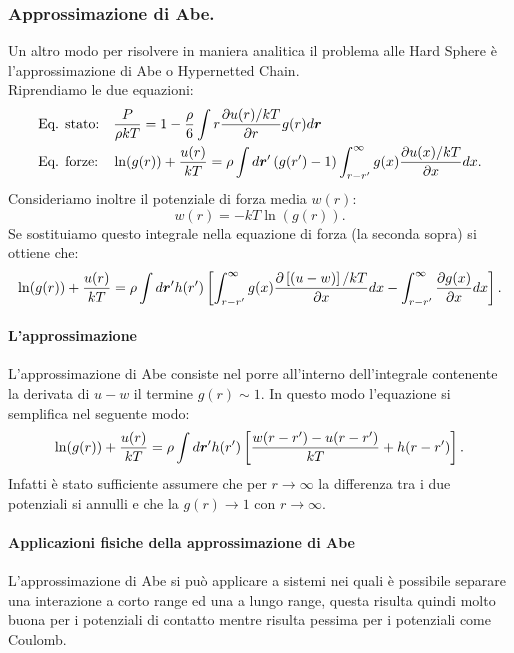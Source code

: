 \subsubsection{Approssimazione di Abe.}
\label{subsubsec:Approssimazione di Abe.}
Un altro modo per risolvere in maniera analitica il problema alle Hard Sphere è l'approssimazione di Abe o Hypernetted Chain. \\
Riprendiamo le due equazioni:
\[\begin{aligned}
	&\text{Eq. stato:} \quad\frac{P}{\rho kT} 
	=
	1-\frac{\rho }{6}\int r \frac{\partial u(r)/kT}{\partial r} g(r) d \boldsymbol{r}\\
	&\text{Eq. forze:}\quad\ln(g(r))+\frac{u(r)}{kT}
	=
	\rho \int d \boldsymbol{r}'\left( g(r')-1 \right) 
	\int_{r-r'}^{\infty} g(x)\frac{\partial u(x)/kT}{\partial x} dx
.\end{aligned}\]
Consideriamo inoltre il potenziale di forza media $w(r)$:
\[
	w(r)=-kT\ln(g(r))
.\] 
Se sostituiamo questo integrale nella equazione di forza (la seconda sopra) si ottiene che:
\[
	\ln(g(r)) + \frac{u(r)}{kT} 
	=
	\rho \int d \boldsymbol{r}'h(r')
	\left[\int_{r-r'}^{\infty} g(x)
	\frac{\partial \left[ \left( u-w \right) \right] /kT}{\partial x}dx 
	-
	\int_{r-r'}^{\infty} \frac{\partial g(x)}{\partial x} dx 
	\right] 
.\]
\paragraph{L'approssimazione}
L'approssimazione di Abe consiste nel porre all'interno dell'integrale contenente la derivata di $u-w$ il termine $g(r)\sim 1$. In questo modo l'equazione si semplifica nel seguente modo:
\[
	\ln(g(r)) + \frac{u(r)}{kT} 
	=
	\rho \int d\boldsymbol{r}'h(r')\left[ \frac{w(r-r')-u(r-r')}{kT} + h(r-r') \right] 
.\] 
Infatti è stato sufficiente assumere che per $r\to \infty$ la differenza tra i due potenziali si annulli e che la $g(r)\to 1$ con $r\to \infty$.
\paragraph{Applicazioni fisiche della approssimazione di Abe}
L'approssimazione di Abe si può applicare a sistemi nei quali è possibile separare una interazione a corto range ed una a lungo range, questa risulta quindi molto buona per i potenziali di contatto mentre risulta pessima per i potenziali come Coulomb.
